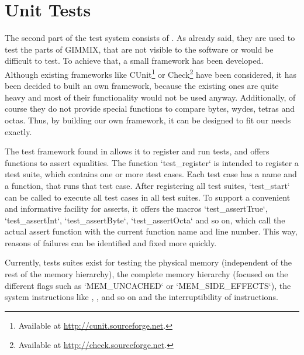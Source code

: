 \section{Unit Tests}

The second part of the test system consists of . As already said, they are used to test the parts of GIMMIX, that are not visible to the software or would be difficult to test. To achieve that, a small  framework has been developed. Although existing frameworks like CUnit\footnote{Available at \url{http://cunit.sourceforge.net}.} or Check\footnote{Available at \url{http://check.sourceforge.net}.} have been considered, it has been decided to built an own framework, because the existing ones are quite heavy and most of their functionality would not be used anyway. Additionally, of course they do not provide special functions to compare bytes, wydes, tetras and octas. Thus, by building our own framework, it can be designed to fit our needs exactly.

The test framework found in  allows it to register and run tests, and offers functions to assert equalities. The function `test_register` is intended to register a \i{test suite}, which contains one or more \i{test cases}. Each test case has a name and a function, that runs that test case. After registering all test suites, `test_start` can be called to execute all test cases in all test suites. To support a convenient and informative facility for asserts, it offers the macros `test_assertTrue`, `test_assertInt`, `test_assertByte`, `test_assertOcta` and so on, which call the actual assert function with the current function name and line number. This way, reasons of failures can be identified and fixed more quickly.

Currently, tests suites exist for testing the physical memory (independent of the rest of the memory hierarchy), the complete memory hierarchy (focused on the different flags such as `MEM_UNCACHED` or `MEM_SIDE_EFFECTS`), the system instructions like , ,  and so on and the interruptibility of instructions.

